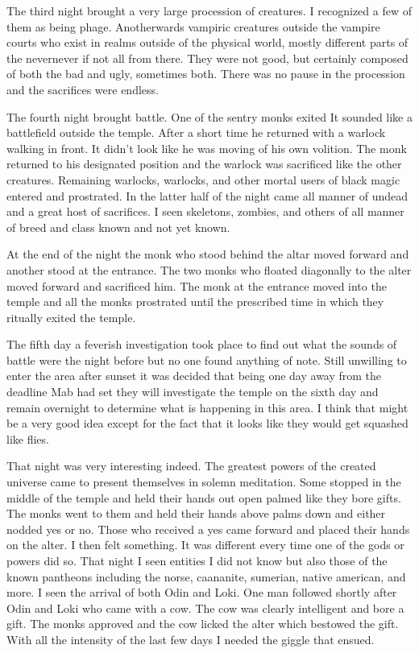 
The third night brought a very large procession of creatures. I recognized a few of them as being phage. Anotherwards vampiric creatures outside the vampire courts who exist in realms outside of the physical world, mostly different parts of the nevernever if not all from there. They were not good, but certainly composed of both the bad and ugly, sometimes both. There was no pause in the procession and the sacrifices were endless. 


The fourth night brought battle. One of the sentry monks exited It sounded like a battlefield outside the temple. After a short time he returned with a warlock walking in front. It didn't look like he was moving of his own volition. The monk returned to his designated position and the warlock was sacrificed like the other creatures. Remaining warlocks, warlocks, and other mortal users of black magic entered and prostrated. In the latter half of the night came all manner of undead and a great host of sacrifices. I seen skeletons, zombies, and others of all manner of breed and class known and not yet known.

At the end of the night the monk who stood behind the altar moved forward and another stood at the entrance. The two monks who floated diagonally to the alter moved forward and sacrificed him. The monk at the entrance moved into the temple and all the monks prostrated until the prescribed time in which they ritually exited the temple.


The fifth day a feverish investigation took place to find out what the sounds of battle were the night before but no one found anything of note. Still unwilling to enter the area after sunset it was decided that being one day away from the deadline Mab had set they will investigate the temple on the sixth day and remain overnight to determine what is happening in this area. I think that might be a very good idea except for the fact that it looks like they would get squashed like flies.


That night was very interesting indeed. The greatest powers of the created universe came to present themselves in solemn meditation. Some stopped in the middle of the temple and held their hands out open palmed like they bore gifts. The monks went to them and held their hands above palms down and either nodded yes or no. Those who received a yes came forward and placed their hands on the alter. I then felt something. It was different every time one of the gods or powers did so. That night I seen entities I did not know but also those of the known pantheons including the norse, caananite, sumerian, native american, and more. I seen the arrival of both Odin and Loki. One man followed shortly after Odin and Loki who came with a cow. The cow was clearly intelligent and bore a gift. The monks approved and the cow licked the alter which bestowed the gift. With all the intensity of the last few days I needed the giggle that ensued.

